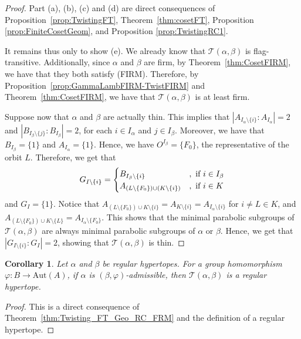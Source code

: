 \documentclass[11pt,letterpaper]{amsart}
\newtheorem{coro}[prop]{Corollary}
\newcommand{\TT}{\mathcal{T}}
\newcommand{\Aut}{\mathrm{Aut}}
\begin{document}
\begin{proof}
    Part (a), (b), (c) and (d) are direct consequences of Proposition~\ref{prop:TwistingFT}, Theorem~\ref{thm:cosetFT}, Proposition \ref{prop:FiniteCosetGeom}, and Proposition \ref{prop:TwistingRC1}.

    It remains thus only to show (e). We already know that $\TT(\alpha,\beta)$ is flag-transitive. Additionally, since $\alpha$ and $\beta$ are firm, by Theorem~\ref{thm:CosetFIRM}, we have that they both satisfy (FIRM). Therefore, by Proposition~\ref{prop:GammaLambFIRM-TwistFIRM} and Theorem~\ref{thm:CosetFIRM}, we have that $\TT(\alpha,\beta)$ is at least firm.
    
    Suppose now that $\alpha$ and $\beta$ are actually thin. This implies that $|A_{I_\alpha\setminus\{i\}}:A_{I_\alpha}|=2$ and $|B_{I_\beta\setminus\{j\}}:B_{I_\beta}|=2$, for each $i\in I_\alpha$ and $j\in I_\beta$.
    Moreover, we have that $B_{I_\beta} = \{1\}$ and $A_{I_\alpha}=\{1\}$. 
    Hence, we have $O^{I_\beta}=\{F_0\}$, the representative of the orbit $L$.
    Therefore, we get that 
    \begin{equation*}
        G_{I\setminus\{i\}} =
        \begin{cases}
            B_{I_\beta\setminus\{i\}}&, \textnormal{ if } i\in I_\beta \\
            A_{(L\setminus\{F_0\})\cup (K\setminus\{i\})}&, \textnormal{ if } i\in K 
        \end{cases}
    \end{equation*}
    and $G_{I}=\{1\}$. Notice that $A_{(L\setminus\{F_0\})\cup K\setminus\{i\}}=A_{K\setminus\{i\}} = A_{I_\alpha\setminus\{i\}}$ for $i \neq L \in K$, and 
    $A_{(L\setminus\{F_0\})\cup K\setminus\{L\}}= A_{I_\alpha\setminus\{F_0\}}$. This shows that the minimal parabolic subgroups of $\TT(\alpha,\beta)$ are always minimal parabolic subgroups of $\alpha$ or $\beta$.
    Hence, we get that $|G_{I\setminus\{i\}}:G_{I}|=2$, showing that $\TT(\alpha,\beta)$ is thin.
\end{proof}

\begin{coro}\label{coro:TwistingHypertope}
    Let $\alpha$ and $\beta$ be regular hypertopes. 
    For a group homomorphism $\varphi: B\rightarrow \Aut(A)$, if $\alpha$ is $(\beta,\varphi)$-admissible, then $\TT(\alpha,\beta)$ is a regular hypertope.
\end{coro}
\begin{proof}
    This is a direct consequence of Theorem~\ref{thm:Twisting_FT_Geo_RC_FRM} and the definition of a regular hypertope.
\end{proof}
\end{document}
